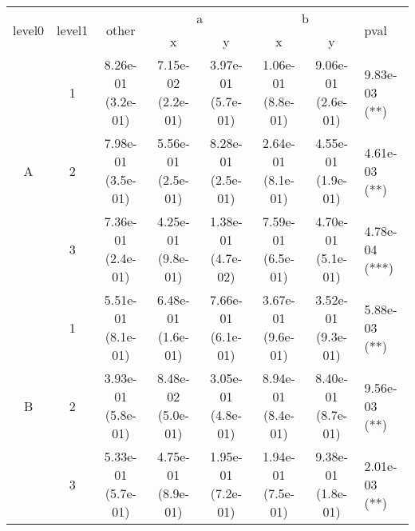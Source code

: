 \begin{tabular}{cccccccl}
\toprule
\multirow{2}{*}{level0} & \multirow{2}{*}{level1}& \multirow{2}{*}{other}&\multicolumn{2}{c}{a}&\multicolumn{2}{c}{b}& \multirow{2}{*}{pval}\tabularnewline
\cmidrule(lr){4-5}
\cmidrule(lr){6-7}
&&&x&y&x&y\tabularnewline
\midrule
\multirow{3}{*}{A}&1& 8.26e-01 (3.2e-01)& 7.15e-02 (2.2e-01)& 3.97e-01 (5.7e-01)& 1.06e-01 (8.8e-01)& 9.06e-01 (2.6e-01)& 9.83e-03 (**)\tabularnewline
&2& 7.98e-01 (3.5e-01)& 5.56e-01 (2.5e-01)& 8.28e-01 (2.5e-01)& 2.64e-01 (8.1e-01)& 4.55e-01 (1.9e-01)& 4.61e-03 (**)\tabularnewline
&3& 7.36e-01 (2.4e-01)& 4.25e-01 (9.8e-01)& 1.38e-01 (4.7e-02)& 7.59e-01 (6.5e-01)& 4.70e-01 (5.1e-01)& 4.78e-04 (***)\tabularnewline
\midrule
\multirow{3}{*}{B}&1& 5.51e-01 (8.1e-01)& 6.48e-01 (1.6e-01)& 7.66e-01 (6.1e-01)& 3.67e-01 (9.6e-01)& 3.52e-01 (9.3e-01)& 5.88e-03 (**)\tabularnewline
&2& 3.93e-01 (5.8e-01)& 8.48e-02 (5.0e-01)& 3.05e-01 (4.8e-01)& 8.94e-01 (8.4e-01)& 8.40e-01 (8.7e-01)& 9.56e-03 (**)\tabularnewline
&3& 5.33e-01 (5.7e-01)& 4.75e-01 (8.9e-01)& 1.95e-01 (7.2e-01)& 1.94e-01 (7.5e-01)& 9.38e-01 (1.8e-01)& 2.01e-03 (**)\tabularnewline
\bottomrule
\end{tabular}
